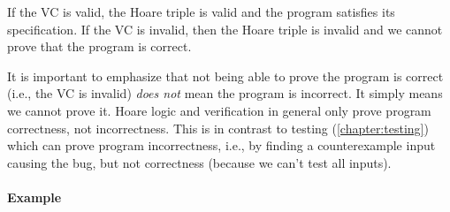 \documentclass[oneside,11pt,dvipsnames]{book}
\begin{document}
If the VC is valid, the Hoare triple is valid and the program satisfies its specification.  If the VC is invalid, then the Hoare triple is invalid and we cannot prove that the program is correct.  

It is important to emphasize that not being able to prove the program is correct (i.e., the VC is invalid) \emph{does not} mean the program is incorrect. It simply means we cannot prove it.  Hoare logic and verification in general only prove program correctness, not incorrectness.  This is in contrast to testing (\autoref{chapter:testing}) which can prove program incorrectness, i.e., by finding a counterexample input causing the bug, but not correctness (because we can't test all inputs).

\paragraph{Example} 
\end{document}
